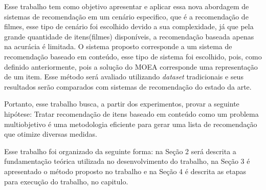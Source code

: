 Esse trabalho tem como objetivo apresentar e aplicar essa  nova abordagem de sistemas de recomendação em um cenário especifico, que é a recomendação de filmes, esse tipo de cenário foi escolhido devido a sua complexidade, já que pela grande quantidade de itens(filmes) disponíveis, a recomendação baseada apenas na acurácia é limitada. O sistema proposto corresponde a um sistema de recomendação baseado em conteúdo, esse tipo de sistema foi escolhido, pois, como definido anteriormente, pois a solução do MOEA corresponde uma representação de um item. Esse método será avaliado utilizando \textit{dataset} tradicionais e seus resultados serão comparados com sistemas de recomendação do estado da arte.

Portanto, esse trabalho busca, a partir dos experimentos, provar a seguinte hipótese: Tratar recomendação de itens baseado em conteúdo como um problema multiobjetivo é uma metodologia eficiente para gerar uma lista de recomendação que otimize diversas medidas.

Esse trabalho foi organizado da seguinte forma: na Seção 2 será descrita a fundamentação teórica utilizada no desenvolvimento do trabalho, na Seção 3 é apresentado o método proposto no trabalho e na Seção 4 é descrita as etapas para execução do trabalho, no capitulo.

